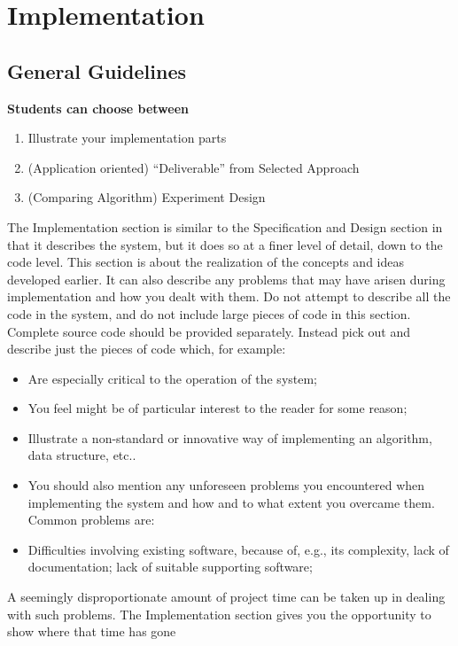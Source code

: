 \chapter{Implementation}

\section{General Guidelines}

\textbf{Students can choose between}

\begin{enumerate}
    \item Illustrate your implementation parts
    \item  (Application oriented) “Deliverable” from Selected Approach
    \item (Comparing Algorithm) Experiment Design
\end{enumerate}

The Implementation section is similar to the Specification and Design section in that it
describes the system, but it does so at a finer level of detail, down to the code level. This section is about the realization of the concepts and ideas developed earlier. It can also describe any problems that may have arisen during implementation and how you dealt with them.
Do not attempt to describe all the code in the system, and do not include large pieces of code in this section. Complete source code should be provided separately. Instead pick out and describe just the pieces of code which, for example:

\begin{itemize}
    \item Are especially critical to the operation of the system;
    \item You feel might be of particular interest to the reader for some reason;
    \item Illustrate a non-standard or innovative way of implementing an algorithm, data structure, etc..
    \item You should also mention any unforeseen problems you encountered when implementing the system and how and to what extent you overcame them. Common problems are:
    \item  Difficulties involving existing software, because of, e.g.,  its complexity, lack of documentation;  lack of suitable supporting software;
\end{itemize}
A seemingly disproportionate amount of project time can be taken up in dealing with such
problems. The Implementation section gives you the opportunity to show where that time has
gone


